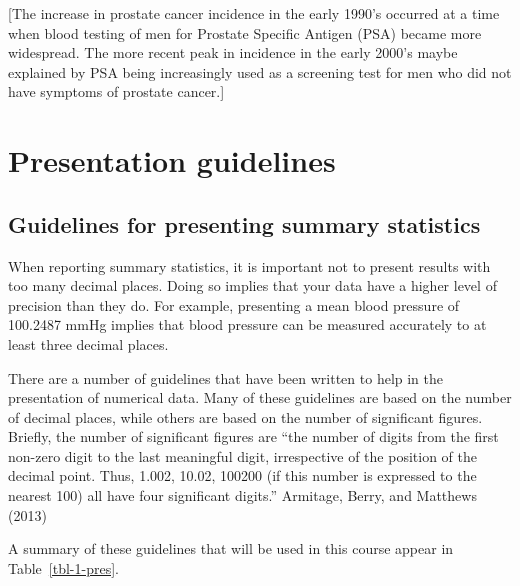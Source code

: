 \documentclass[
  a4paper,
]{memoir}
\begin{document}
{[}The increase in prostate cancer incidence in the early 1990's
occurred at a time when blood testing of men for Prostate Specific
Antigen (PSA) became more widespread. The more recent peak in incidence
in the early 2000's maybe explained by PSA being increasingly used as a
screening test for men who did not have symptoms of prostate cancer.{]}

\hypertarget{presentation-guidelines}{%
\section{Presentation guidelines}\label{presentation-guidelines}}

\hypertarget{guidelines-for-presenting-summary-statistics}{%
\subsection{Guidelines for presenting summary
statistics}\label{guidelines-for-presenting-summary-statistics}}

When reporting summary statistics, it is important not to present
results with too many decimal places. Doing so implies that your data
have a higher level of precision than they do. For example, presenting a
mean blood pressure of 100.2487 mmHg implies that blood pressure can be
measured accurately to at least three decimal places.

There are a number of guidelines that have been written to help in the
presentation of numerical data. Many of these guidelines are based on
the number of decimal places, while others are based on the number of
significant figures. Briefly, the number of significant figures are
``the number of digits from the first non-zero digit to the last
meaningful digit, irrespective of the position of the decimal point.
Thus, 1.002, 10.02, 100200 (if this number is expressed to the nearest
100) all have four significant digits.'' Armitage, Berry, and Matthews
(2013)

A summary of these guidelines that will be used in this course appear in
Table~\ref{tbl-1-pres}.

\hypertarget{tbl-1-pres}{}
 
  \providecommand{\huxb}[2]{\arrayrulecolor[RGB]{#1}\global\arrayrulewidth=#2pt}
  \providecommand{\huxvb}[2]{\color[RGB]{#1}\vrule width #2pt}
  \providecommand{\huxtpad}[1]{\rule{0pt}{#1}}
  \providecommand{\huxbpad}[1]{\rule[-#1]{0pt}{#1}}
\end{document}
